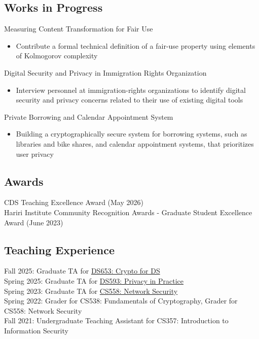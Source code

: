 \documentclass[letterpaper,11pt]{article}
\begin{document}
\subsection*{Works in Progress}
\begin{enumerate}[label={[\arabic*]}, leftmargin=*, align=left]

\item Measuring Content Transformation for Fair Use
\begin{itemize}[nosep]
    \item Contribute a formal technical definition of a fair-use property using elements of Kolmogorov complexity
\end{itemize}

\item Digital Security and Privacy in Immigration Rights Organization
\begin{itemize}[nosep]
    \item Interview personnel at immigration-rights organizations to identify digital security and privacy concerns related to their use of existing digital tools
\end{itemize}

\item Private Borrowing and Calendar Appointment System 
\begin{itemize}[nosep]
    \item Building a cryptographically secure system for borrowing systems, such as libraries and bike shares, and calendar appointment systems, that prioritizes user privacy
\end{itemize}


\end{enumerate}

\subsection*{Awards}
CDS Teaching Excellence Award (May 2026)\\
Hariri Institute Community Recognition Awards - Graduate Student Excellence Award (June 2023)

\subsection*{Teaching Experience}
Fall 2025: Graduate TA for \href{https://crypto-ds.github.io/}{DS653: Crypto for DS} \\
Spring 2025: Graduate TA for \href{https://alishahc.com/teaching/ds593-sp25/sp25-classpage.html}{DS593: Privacy in Practice} \\
Spring 2023: Graduate TA for \href{https://www.cs.umd.edu/~kaptchuk/teaching/cs558/sp23-classpage.html}{CS558: Network Security} \\
Spring 2022: Grader for CS538: Fundamentals of Cryptography, Grader for CS558: Network Security\\ 
Fall 2021: Undergraduate Teaching Assistant for CS357: Introduction to Information Security
\end{document}
